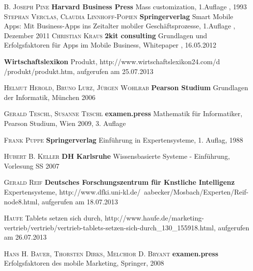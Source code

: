 \begin{thebibliography}{---}
             \textsc{B. Joseph Pine}
            \textbf{Harvard Business Press}
            Mass customization, 1.Auflage , 1993
             \textsc{Stephan Verclas, Claudia Linnhoff-Popien}
            \textbf{Springerverlag}
            Smart Mobile Apps: Mit Business-Apps ins Zeitalter mobiler Geschäftsprozesse, 1.Auflage , Dezember 2011
             \textsc{Christian Kraus}
            \textbf{2kit consulting}
            Grundlagen und Erfolgsfaktoren 
            für Apps im Mobile Business, Whitepaper , 16.05.2012

            \textbf{Wirtschaftslexikon}
            Produkt, http://www.wirtschaftslexikon24.com/d /produkt/produkt.htm, aufgerufen am 25.07.2013
            
 			\textsc{Helmut Herold, Bruno Lurz, Jürgen Wohlrab}
             \textbf{Pearson Studium}
             Grundlagen der Informatik, München 2006
             
  			\textsc{Gerald Teschl, Susanne Teschl}
              \textbf{examen.press}
              Mathematik
              für Informatiker, Pearson Studium, Wien 2009, 3. Auflage
                         			 
 			 \textsc{Frank Puppe}
 			 \textbf{Springerverlag}
 			 Einführung in Expertensysteme, 1. Auflag, 1988
 			 
  			 \textsc{Hubert B. Keller}
  			 \textbf{DH Karlsruhe}
  			 Wissensbasierte Systeme - Einführung, Vorlesung SS 2007
  			 
			\textsc{Gerald Reif}
            \textbf{Deutsches Forschungszentrum für Knstliche Intelligenz}
            Expertensysteme, http://www.dfki.uni-kl.de/~aabecker/Mosbach/Experten/Reif-node8.html, aufgerufen am 18.07.2013
 
            \textsc{Haufe}
           Tablets setzen sich durch, http://www.haufe.de/marketing-vertrieb/vertrieb/vertrieb-tablets-setzen-sich-durch\_130\_155918.html, aufgerufen am 26.07.2013           
            
   			\textsc{Hans H. Bauer, Thorsten Dirks, Melchior D. Bryant}
               \textbf{examen.press}
               Erfolgsfaktoren des mobile Marketing, Springer, 2008
               

\end{thebibliography}
